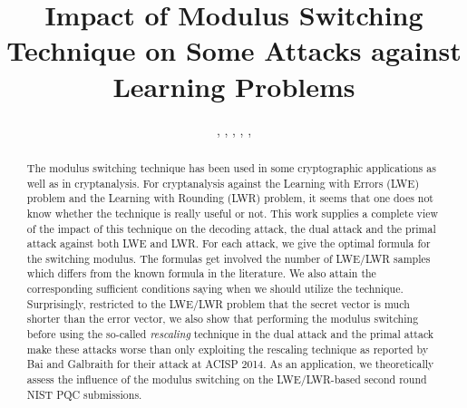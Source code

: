 \documentclass{cta-author}
\begin{document}
	
	
	\title{Impact of Modulus Switching Technique on Some Attacks against Learning Problems}
	
	\author{, , , , , }
	
	\address{
		}
	
 
\begin{abstract}
	  The modulus switching technique has been used in some cryptographic applications as well as in cryptanalysis.  For cryptanalysis against the Learning with Errors (LWE) problem and the Learning with Rounding (LWR) problem, it seems that one does not know whether the technique is really useful or not. This work supplies a complete view of the impact of this technique on the decoding attack, the dual attack and the primal attack against both LWE and LWR. For each attack, we give the optimal formula for the switching modulus. The formulas get involved the number of LWE/LWR samples which differs from the known formula in the literature. We also attain the corresponding sufficient conditions saying when we should utilize the technique. Surprisingly, restricted to the LWE/LWR problem that the secret vector is much shorter than the error vector, we also show that performing the modulus switching before using the so-called \textit{rescaling} technique in the dual attack and the primal attack make these attacks worse than only exploiting the rescaling technique as reported by Bai and Galbraith for their attack at ACISP 2014. As an application, we theoretically assess the influence of the modulus switching on the LWE/LWR-based second round NIST PQC submissions.
	
	
\end{abstract}

\maketitle
\end{document}
